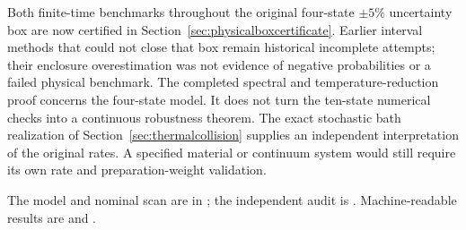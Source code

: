 \documentclass[11pt]{article}
\begin{document}
Both finite-time benchmarks throughout the original four-state $\pm5\%$
uncertainty box are now certified in Section~\ref{sec:physicalboxcertificate}.
Earlier interval methods that could not close that box remain historical
incomplete attempts; their enclosure overestimation was not evidence of
negative probabilities or a failed physical benchmark. The completed
spectral and temperature-reduction proof concerns the four-state model.
It does not turn the ten-state numerical checks into a continuous
robustness theorem. The exact stochastic bath realization of
Section~\ref{sec:thermalcollision} supplies an independent interpretation
of the original rates. A specified material or continuum system would
still require its own rate and preparation-weight validation.

The model and nominal scan are in
; the independent audit is
. Machine-readable results
are  and
.
\end{document}

